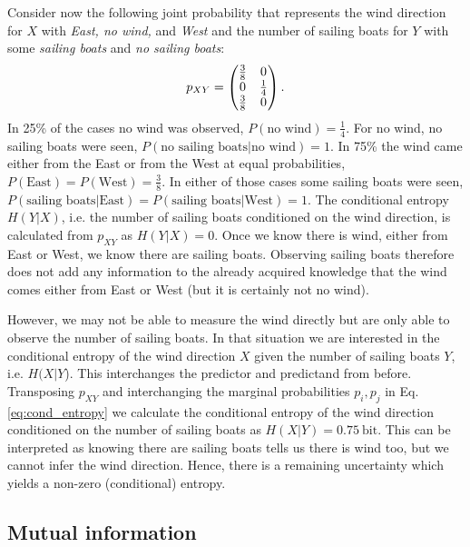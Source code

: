 Consider now the following joint probability that represents the wind direction for $X$ with \emph{East, no wind,} and \emph{West} and
the number of sailing boats for $Y$ with some \emph{sailing boats} and \emph{no sailing boats}:
\begin{equation}
	p_{XY} = \begin{pmatrix} \tfrac{3}{8} & 0 \\
				0 & \tfrac{1}{4} \\
				\tfrac{3}{8} & 0 \end{pmatrix}.
\end{equation}
In 25\% of the cases no wind was observed, $P(\text{no wind}) = \tfrac{1}{4}$. For no wind, no sailing boats were seen,
$P(\text{no sailing boats} \vert \text{no wind}) = 1$. In 75\% the wind came either from the East or from the West at
equal probabilities, $P(\text{East}) = P(\text{West}) = \tfrac{3}{8}$. In either of those cases some sailing boats were seen,
$P(\text{sailing boats} \vert \text{East}) = P(\text{sailing boats} \vert \text{West}) =1$. The conditional entropy $H(Y \vert X)$,
i.e. the number of sailing boats conditioned on the wind direction, is calculated from $p_{XY}$ as $H(Y \vert X) = 0$. Once
we know there is wind, either from East or West, we know there are sailing boats. Observing sailing boats therefore does 
not add any information to the already acquired knowledge that the wind comes either from East or West (but it is certainly not
no wind).

However, we may not be able to measure the wind directly but are only able to observe the number of sailing boats.
In that situation we are interested in the conditional entropy of the wind direction $X$ given the number of sailing boats $Y$, i.e.
$H(X\vert Y$). This interchanges the predictor and predictand from before. Transposing $p_{XY}$ and interchanging the
marginal probabilities $p_i, p_j$ in Eq. \ref{eq:cond_entropy} we calculate the conditional entropy of the wind direction
conditioned on the number of sailing boats as $H(X\vert Y) = 0.75~\mathrm{bit}$.
This can be interpreted as knowing there are sailing boats tells us there is wind too, but we cannot infer the wind direction.
Hence, there is a remaining uncertainty which yields a non-zero (conditional) entropy.

\subsection{Mutual information}
\label{sec:mutual_information}

